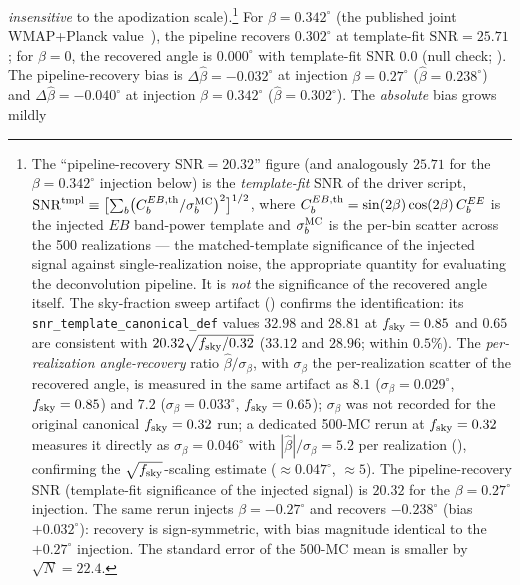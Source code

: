 \documentclass[aps,prd,twocolumn,superscriptaddress,showpacs,preprintnumbers,nofootinbib,longbibliography,floatfix]{revtex4-2}
\begin{document}
\emph{insensitive} to the apodization scale).\footnote{\label{fn:snr_definition}The
``pipeline-recovery SNR$=20.32$'' figure (and analogously $25.71$ for the
$\beta=0.342^\circ$ injection below) is the \emph{template-fit} SNR of the
driver script,
$\mathrm{SNR}^{\rm tmpl}\equiv\bigl[\sum_b
\bigl(C_b^{EB,\rm th}/\sigma_b^{\rm MC}\bigr)^2\bigr]^{1/2}$, where
$C_b^{EB,\rm th} = \sin(2\beta)\cos(2\beta)\,C_b^{EE}$ is the injected
$EB$ band-power template and $\sigma_b^{\rm MC}$ is the per-bin scatter
across the 500 realizations --- the matched-template significance of the
injected signal against single-realization noise, the appropriate quantity
for evaluating the deconvolution pipeline. It is \emph{not} the
significance of the recovered angle itself. The sky-fraction sweep
artifact () confirms the identification: its
\texttt{snr\_template\_canonical\_def} values $32.98$ and $28.81$ at
$f_{\rm sky}=0.85$ and $0.65$ are consistent with
$20.32\sqrt{f_{\rm sky}/0.32}$ ($33.12$ and $28.96$; within $0.5\%$). The
\emph{per-realization angle-recovery} ratio
$\hat\beta/\sigma_\beta$, with $\sigma_\beta$ the per-realization scatter
of the recovered angle, is measured in the same artifact as $8.1$
($\sigma_\beta = 0.029^\circ$, $f_{\rm sky}=0.85$) and $7.2$
($\sigma_\beta = 0.033^\circ$, $f_{\rm sky}=0.65$); $\sigma_\beta$ was not recorded for the original canonical
$f_{\rm sky}=0.32$ run; a dedicated 500-MC rerun at $f_{\rm sky}=0.32$
measures it directly as $\sigma_\beta = 0.046^\circ$ with
$|\hat\beta|/\sigma_\beta = 5.2$ per realization
(),
confirming the $\sqrt{f_{\rm sky}}$-scaling estimate
($\approx\!0.047^\circ$, $\approx\!5$).
The pipeline-recovery SNR (template-fit significance of the injected
signal) is $20.32$ for the $\beta=0.27^\circ$ injection.
The same rerun injects $\beta=-0.27^\circ$ and recovers
$-0.238^\circ$ (bias $+0.032^\circ$): recovery is sign-symmetric, with
bias magnitude identical to the $+0.27^\circ$ injection. The standard error of the 500-MC
mean is smaller by $\sqrt{N}=22.4$.}
For $\beta=0.342^\circ$ (the published joint
WMAP+Planck value~\cite{Eskilt2022}), the pipeline recovers $0.302^\circ$ at
template-fit $\mathrm{SNR}=25.71$; for
$\beta=0$, the recovered angle is $0.000^\circ$ with template-fit SNR $0.0$
(null check; ). The
pipeline-recovery bias is $\Delta\hat\beta = -0.032^\circ$ at injection
$\beta=0.27^\circ$ ($\hat\beta=0.238^\circ$) and
$\Delta\hat\beta = -0.040^\circ$ at injection $\beta=0.342^\circ$
($\hat\beta=0.302^\circ$). The \emph{absolute} bias grows mildly
\end{document}

